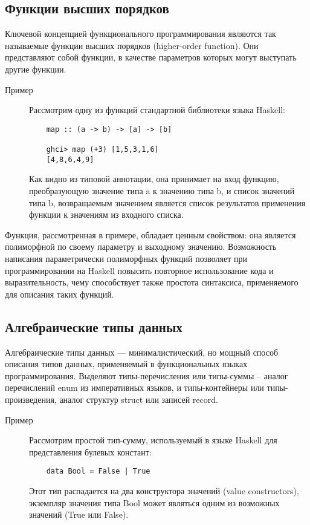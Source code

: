 \subsection{Функции высших порядков}
Ключевой концепцией функционального программирования являются так называемые функции высших порядков (higher-order function). Они представляют собой функции, в качестве параметров которых могут выступать другие функции. 

\begin{description}
  \item[Пример] 
  Рассмотрим одну из функций стандартной библиотеки языка Haskell: 
  \begin{lstlisting}
    map :: (a -> b) -> [a] -> [b]

    ghci> map (+3) [1,5,3,1,6]  
    [4,8,6,4,9]
  \end{lstlisting}
  Как видно из типовой аннотации, она принимает на вход функцию, преобразующую значение типа a к значению типа b, и список значений типа b, возвращаемым значением является список результатов применения функции к значениям из входного списка.  
\end{description}

Функция, рассмотренная в примере, обладает ценным свойством: она является полиморфной по своему параметру и выходному значению. Возможность написания параметрически полиморфных функций позволяет при программировании на Haskell повысить повторное использование кода и выразительность, чему способствует также простота синтаксиса, применяемого для описания таких функций.     

\subsection{Алгебраические типы данных}

Алгебраические типы данных --- минималистический, но мощный способ описания типов данных, применяемый в функциональных языках программирования. Выделяют типы-перечисления или типы-суммы -- аналог перечислений enum из императивных языков, и типы-контейнеры или типы-произведения, аналог структур struct или записей record.

\begin{description}
  \item[Пример] 
  Рассмотрим простой тип-сумму, используемый в языке Haskell для представления булевых констант: 
  \begin{lstlisting}
    data Bool = False | True  

  \end{lstlisting}
  Этот тип распадается на два конструктора значений (value constructors), экземпляр значения типа Bool может являться одним из возможных значений (True или False).
\end{description}

